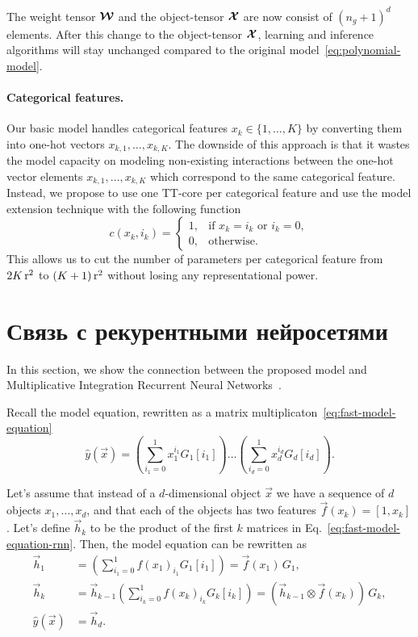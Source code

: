 The weight tensor $\boldsymbol{\mathcal{W}}$ and the object-tensor $\boldsymbol{\mathcal{X}}$ are now consist of $(n_g + 1)^d$ elements.
After this change to the object-tensor $\boldsymbol{\mathcal{X}}$, learning and inference algorithms will stay unchanged compared to the original model~\eqref{eq:polynomial-model}.

\paragraph{Categorical features.} Our basic model handles categorical features $x_k \in \{1, \ldots, K\}$ by converting them into one-hot vectors $x_{k,1}, \ldots, x_{k,K}$. The downside of this approach is that it wastes the model capacity on modeling non-existing interactions between the one-hot vector elements $x_{k,1}, \ldots, x_{k,K}$ which correspond to the same categorical feature. Instead, we propose to use one TT-core per categorical feature and use the model extension technique with the following function
\begin{equation*}
c(x_k, i_k) =
\begin{cases}
1, & \text{if } x_k = i_k \text{ or } i_k = 0,\\
0, & \text{otherwise.}
\end{cases}
\end{equation*}
This allows us to cut the number of parameters per categorical feature from $2K\operatorname{r}^2$ to $(K + 1)\operatorname{r}^2$ without losing any representational power.

\section{Связь с рекурентными нейросетями}
In this section, we show the connection between the proposed model and Multiplicative Integration Recurrent Neural Networks~\cite{wu2016multiplicative}.

Recall the model equation, rewritten as a matrix multiplicaton~\eqref{eq:fast-model-equation}
\begin{equation}
\label{eq:fast-model-equation-rnn}
\widehat{y}(\vec{x}) = \left ( \sum_{i_1=0}^1 x_1^{i_1} G_1[i_1] \right ) \ldots \left ( \sum_{i_d=0}^1 x_d^{i_d} G_d[i_d] \right ).
\end{equation}

 Let's assume that instead of a $d$-dimensional object $\vec{x}$ we have a sequence of $d$ objects $x_1, \ldots, x_d$, and that each of the objects has two features $\vec{f}(x_k) = [1, x_k]$. Let's define $\vec{h}_k$ to be the product of the first $k$ matrices in Eq.~\eqref{eq:fast-model-equation-rnn}. Then, the model equation can be rewritten as
 \begin{align*}
\vec{h}_1 &=  \left ( \sum_{i_1=0}^1 f(x_1)_{i_1} G_1[i_1] \right ) = \vec{f}(x_1) \, G_1,\\
\vec{h}_k &= \vec{h}_{k-1} \left ( \sum_{i_k=0}^1 f(x_k)_{i_k} G_k[i_k] \right ) = \left (\vec{h}_{k-1} \otimes \vec{f}(x_k) \right) \, G_k,\\
\widehat{y}(\vec{x}) &= \vec{h}_d.
\end{align*}

